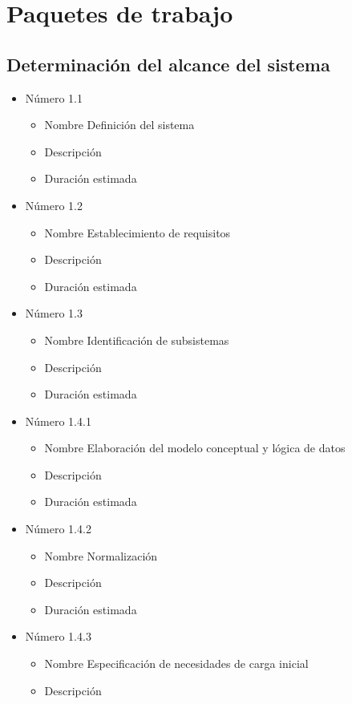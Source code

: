 \documentclass[11pt,a4paper,spanish,twoside]{report}
\begin{document}
\chapter{Paquetes de trabajo}
\section{Determinación del alcance del sistema}
\begin{itemize}
\item{Número} 1.1
\begin{itemize}
\item{Nombre} Definición del sistema
\item{Descripción} 
\item{Duración estimada} 
\end{itemize}
\item{Número} 1.2
\begin{itemize}
\item{Nombre} Establecimiento de requisitos
\item{Descripción} 
\item{Duración estimada} 
\end{itemize}
\item{Número} 1.3
\begin{itemize}
\item{Nombre} Identificación de subsistemas
\item{Descripción} 
\item{Duración estimada} 
\end{itemize}
\item{Número} 1.4.1
\begin{itemize}
\item{Nombre} Elaboración del modelo conceptual y lógica de datos
\item{Descripción}
\item{Duración estimada} 
\end{itemize}
\item{Número} 1.4.2
\begin{itemize}
\item{Nombre} Normalización
\item{Descripción}
\item{Duración estimada} 
\end{itemize}
\item{Número} 1.4.3
\begin{itemize}
\item{Nombre} Especificación de necesidades de carga inicial
\item{Descripción} 

\end{itemize}
\end{itemize}
\end{document}
